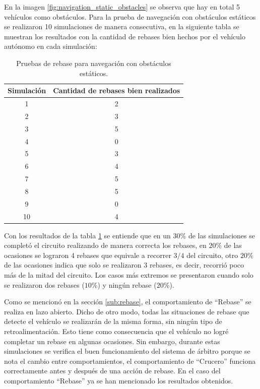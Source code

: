 En la imagen \ref{fig:navigation_static_obstacles} se observa que hay en total 5 vehículos como obstáculos. Para la prueba de navegación con obstáculos estáticos se realizaron 10 simulaciones de manera consecutiva, en la siguiente tabla se muestran los resultados con la cantidad de rebases bien hechos por el vehículo autónomo en cada simulación:
\begin{table}[h]
    \begin{center}
        \begin{tabular}{c|c}
        \hline
            Simulación & Cantidad de rebases bien realizados\\ \hline 
            1 & 2 \\ 
            2 & 3\\ 
            3 & 5\\ 
            4 & 0\\ 
            5 & 3\\ 
            6 & 4\\ 
            7 & 5\\ 
            8 & 5\\ 
            9 & 0\\ 
            10 & 4\\ 
        \end{tabular}
    \end{center}
    \caption{Pruebas de rebase para navegación con obstáculos estáticos.}
    \label{tab:navigation_static_obstacles}
\end{table}

Con los resultados de la tabla \ref{tab:navigation_static_obstacles} se entiende que en un $30\%$ de las simulaciones se completó el circuito realizando de manera correcta los rebases, en $20\%$ de las ocasiones se lograron 4 rebases que equivale a recorrer $3/4$ del circuito, otro $20\%$ de las ocasiones indica que solo se realizaron 3 rebases, es decir, recorrió poco más de la mitad del circuito. Los casos más extremos se presentaron cuando solo se realizaron dos rebases ($10\%$) y ningún rebase ($20\%$). 

Como se mencionó en la sección \ref{sub:rebase}, el comportamiento de ``Rebase'' se realiza en lazo abierto. Dicho de otro modo, todas las situaciones de rebase que detecte el vehículo se realizarán de la misma forma, sin ningún tipo de retroalimentación. Esto tiene como consecuencia que el vehículo no logré completar un rebase en algunas ocasiones. Sin embargo, durante estas simulaciones se verifica el buen funcionamiento del sistema de árbitro porque se nota el cambio entre comportamientos, el comportamiento de ``Crucero'' funciona correctamente antes y después de una acción de rebase. En el caso del comportamiento ``Rebase'' ya se han mencionado los resultados obtenidos.

